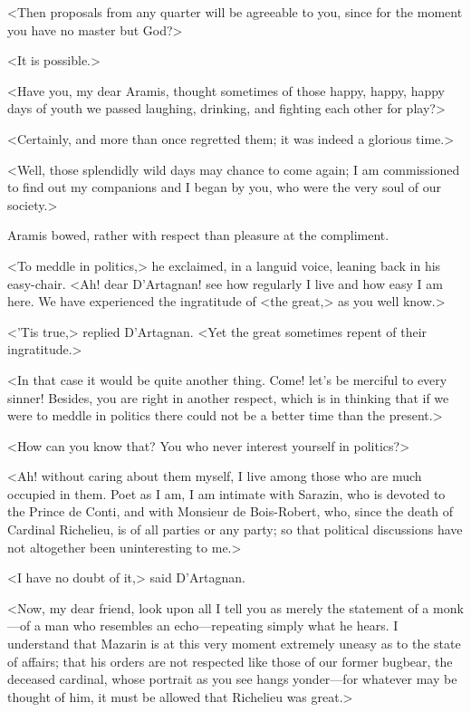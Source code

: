 <Then proposals from any quarter will be agreeable to you, since for the moment you have no master but God?>

<It is possible.>

<Have you, my dear Aramis, thought sometimes of those happy, happy, happy days of youth we passed laughing, drinking, and fighting each other for play?>

<Certainly, and more than once regretted them; it was indeed a glorious time.>

<Well, those splendidly wild days may chance to come again; I am commissioned to find out my companions and I began by you, who were the very soul of our society.>

Aramis bowed, rather with respect than pleasure at the compliment.

<To meddle in politics,> he exclaimed, in a languid voice, leaning back in his easy-chair. <Ah! dear D'Artagnan! see how regularly I live and how easy I am here. We have experienced the ingratitude of <the great,> as you well know.>

<'Tis true,> replied D'Artagnan. <Yet the great sometimes repent of their ingratitude.>

<In that case it would be quite another thing. Come! let's be merciful to every sinner! Besides, you are right in another respect, which is in thinking that if we were to meddle in politics there could not be a better time than the present.>

<How can you know that? You who never interest yourself in politics?>

<Ah! without caring about them myself, I live among those who are much occupied in them. Poet as I am, I am intimate with Sarazin, who is devoted to the Prince de Conti, and with Monsieur de Bois-Robert, who, since the death of Cardinal Richelieu, is of all parties or any party; so that political discussions have not altogether been uninteresting to me.>

<I have no doubt of it,> said D'Artagnan.

<Now, my dear friend, look upon all I tell you as merely the statement of a monk—of a man who resembles an echo—repeating simply what he hears. I understand that Mazarin is at this very moment extremely uneasy as to the state of affairs; that his orders are not respected like those of our former bugbear, the deceased cardinal, whose portrait as you see hangs yonder—for whatever may be thought of him, it must be allowed that Richelieu was great.>

